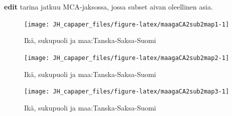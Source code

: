 \documentclass[
  finnish,
]{book}
\begin{document}
\textbf{edit} tarina jatkuu MCA-jaksossa, jossa subset aivan oleellinen
asia.

\begin{figure}

{\centering \texttt{[image: JH\_capaper\_files/figure-latex/maagaCA2sub2map1-1]} 

}

\caption{Ikä, sukupuoli ja maa:Tanska-Saksa-Suomi}\label{fig:maagaCA2sub2map1}
\end{figure}

\begin{figure}

{\centering \texttt{[image: JH\_capaper\_files/figure-latex/maagaCA2sub2map2-1]} 

}

\caption{Ikä, sukupuoli ja maa:Tanska-Saksa-Suomi}\label{fig:maagaCA2sub2map2}
\end{figure}

\begin{figure}

{\centering \texttt{[image: JH\_capaper\_files/figure-latex/maagaCA2sub2map3-1]} 

}

\caption{Ikä, sukupuoli ja maa:Tanska-Saksa-Suomi}\label{fig:maagaCA2sub2map3}
\end{figure}
\end{document}
